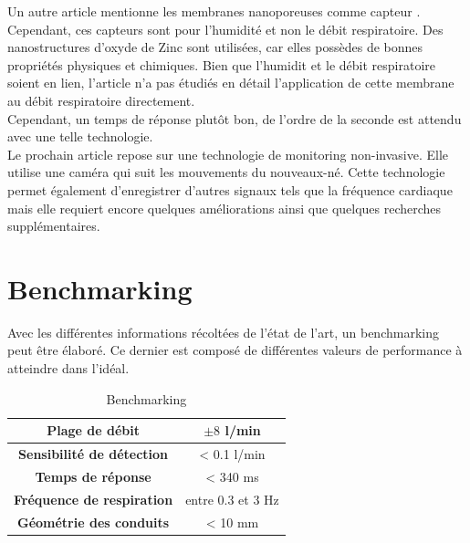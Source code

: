 Un autre article mentionne les membranes nanoporeuses comme capteur \cite{moharamzadeh_fabrication_2018}. Cependant, ces capteurs sont pour l'humidité et non le débit 
respiratoire. Des nanostructures d'oxyde de Zinc sont utilisées, car elles possèdes de bonnes propriétés physiques et chimiques. Bien que l'humidit 
et le débit respiratoire soient en lien, l'article n'a pas étudiés en détail l'application de cette membrane au débit respiratoire directement. \\
Cependant, un temps de réponse plutôt bon, de l'ordre de la seconde est attendu avec une telle technologie. \\

Le prochain article repose sur une technologie de monitoring non-invasive. Elle utilise une caméra qui suit les mouvements du nouveaux-né. 
Cette technologie permet également d'enregistrer d'autres signaux tels que la fréquence cardiaque mais elle requiert encore quelques améliorations 
ainsi que quelques recherches supplémentaires. 

\section{Benchmarking}
Avec les différentes informations récoltées de l'état de l'art, un benchmarking peut être élaboré. Ce dernier est composé de différentes valeurs 
de performance à atteindre dans l'idéal. 

\begin{table}[H]
    \centering
    \begin{tabular}{|c|c|}
        \hline
        \textbf{Plage de débit}           & $\pm 8$ l/min     \\
        \hline
        \textbf{Sensibilité de détection} & < 0.1 l/min       \\
        \hline
        \textbf{Temps de réponse}         & < 340 ms          \\
        \hline
        \textbf{Fréquence de respiration} & entre 0.3 et 3 Hz \\
        \hline
        \textbf{Géométrie des conduits}   & < 10 mm           \\
        \hline
    \end{tabular}
    \caption{Benchmarking}
    \label{fig:benchmarking}
\end{table}


